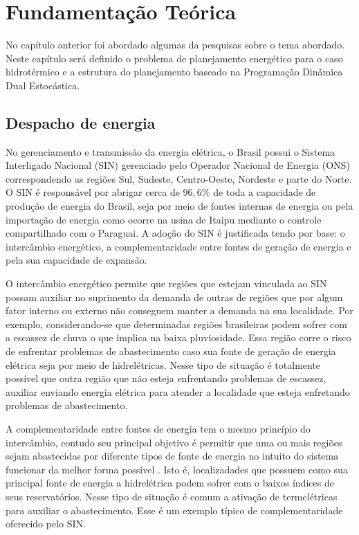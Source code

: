 \chapter{Fundamenta\c c\~ao Te\'orica}
No cap\'itulo anterior foi abordado algumas da pesquisas sobre o tema abordado. Neste cap\'itulo ser\'a definido o
problema de planejamento energ\'etico para o caso hidrot\'ermico e a estrutura do planejamento baseado na Programa\c c\~ao
Din\^amica Dual Estoc\'astica.
\section{Despacho de energia}
No gerenciamento e transmiss\~ao da energia el\'etrica, o Brasil possui o Sistema Interligado Nacional
(SIN)
gerenciado pelo Operador Nacional de Energia (ONS)
 correspondendo as regi\~oes Sul, Sudeste, Centro-Oeste, Nordeste e parte do Norte. O SIN \'e respons\'avel por abrigar cerca de
$96,6\%$ de toda a capacidade de produ\c c\~ao de energia do Brasil, seja por meio de fontes internas de energia
ou pela importa\c c\~ao de energia como ocorre na usina de Itaipu mediante o controle compartilhado com o
Paraguai\cite{an}. A ado\c c\~ao do SIN \'e justificada tendo por base: o interc\^ambio energ\'etico, a
complementaridade entre fontes de gera\c c\~ao de energia e pela sua capacidade de expans\~ao.

O interc\^ambio energ\'etico permite que regi\~oes que estejam vinculada ao SIN possam auxiliar no suprimento da
demanda de outras de regi\~oes que por algum fator interno ou externo n\~ao conseguem manter a demanda na sua localidade\cite{an}. Por
exemplo, considerando-se que determinadas regi\~oes brasileiras podem sofrer com a escassez de chuva o que implica na
baixa pluviosidade. Essa regi\~ao corre o risco de enfrentar problemas de abastecimento caso sua fonte de gera\c c\~ao
de energia el\'etrica seja por meio de hidrel\'etricas. Nesse tipo de situa\c c\~ao \'e totalmente poss\'ivel que outra
regi\~ao que n\~ao esteja enfrentando problemas de escassez, auxiliar enviando energia el\'etrica para atender a
localidade que esteja enfretando problemas de abastecimento. 

A complementaridade entre fontes de energia tem o mesmo princ\'ipio do interc\^ambio, contudo seu principal objetivo \'e permitir
que uma ou mais regi\~oes sejam abastecidas por diferente tipos de fonte de energia no intuito do sistema funcionar
da melhor forma poss\'ivel \cite{tom}. Isto \'e, localizadades que possuem como sua principal fonte de energia a
hidrel\'etrica podem sofrer com o baixos \'indices de seus reservat\'orios. Nesse tipo de situa\c c\~ao
\'e comum a ativa\c c\~ao de termel\'etricas para auxiliar o abastecimento. Esse \'e um exemplo t\'ipico de
complementaridade oferecido pelo SIN. 

